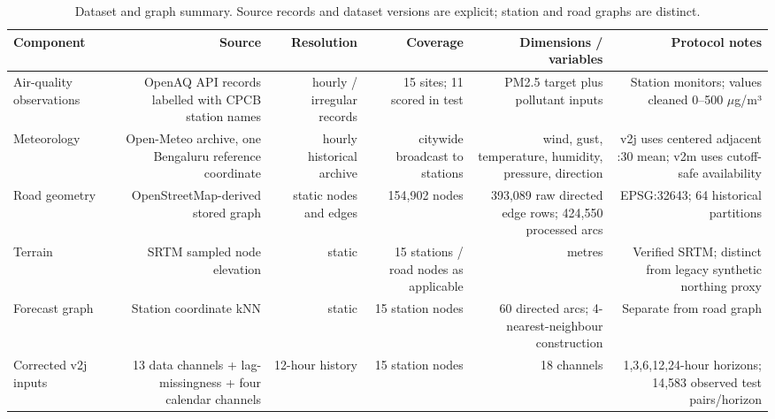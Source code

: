 \begin{table}[t]
\centering
\scriptsize
\caption{Dataset and graph summary. Source records and dataset versions are explicit; station and road graphs are distinct.}
\label{tab:t01_dataset_graph_summary}
\begin{tabular}{lrrrrr}
\hline
Component & Source & Resolution & Coverage & Dimensions / variables & Protocol notes \\
\hline
Air-quality observations & OpenAQ API records labelled with CPCB station names & hourly / irregular records & 15 sites; 11 scored in test & PM2.5 target plus pollutant inputs & Station monitors; values cleaned 0–500 $\mu$g/m³ \\
Meteorology & Open-Meteo archive, one Bengaluru reference coordinate & hourly historical archive & citywide broadcast to stations & wind, gust, temperature, humidity, pressure, direction & v2j uses centered adjacent :30 mean; v2m uses cutoff-safe availability \\
Road geometry & OpenStreetMap-derived stored graph & static nodes and edges & 154,902 nodes & 393,089 raw directed edge rows; 424,550 processed arcs & EPSG:32643; 64 historical partitions \\
Terrain & SRTM sampled node elevation & static & 15 stations / road nodes as applicable & metres & Verified SRTM; distinct from legacy synthetic northing proxy \\
Forecast graph & Station coordinate kNN & static & 15 station nodes & 60 directed arcs; 4-nearest-neighbour construction & Separate from road graph \\
Corrected v2j inputs & 13 data channels + lag-missingness + four calendar channels & 12-hour history & 15 station nodes & 18 channels & 1,3,6,12,24-hour horizons; 14,583 observed test pairs/horizon \\
\hline
\end{tabular}
\end{table}

